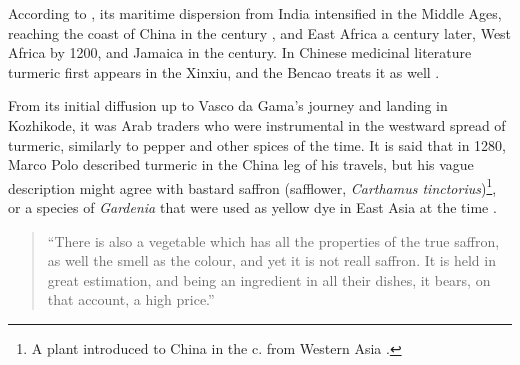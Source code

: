 According to \textcite[2]{nair_turmeric_2019}, its maritime dispersion from India intensified in the Middle Ages, reaching the coast of China in the  century \AD, and East Africa a century later, West Africa by 1200, and Jamaica in the  century. In Chinese medicinal literature turmeric first appears in the \gls{Xinxiu}, and the \gls{Bencao} treats it as well \autocite{feng_molecular_2011}. 

From its initial diffusion up to Vasco da Gama's journey and landing in Kozhikode, it was Arab traders who were instrumental in the westward spread of turmeric, similarly to pepper and other spices of the time. It is said that in 1280, Marco Polo described turmeric in the China leg of his travels, but his vague description might agree with bastard saffron (safflower, \textit{Carthamus tinctorius})\footnote{A plant introduced to China in the  c. \BC from Western Asia \autocite[226]{polo_travels_1993}.}, or a species of \textit{Gardenia} that were used as yellow dye in East Asia at the time \autocite[226]{polo_travels_1993}.

\begin{quote}
	``There is also a vegetable which has all the properties of the true saffron, as well the smell as the colour, and yet it is not reall saffron. It is held in great estimation, and being an ingredient in all their dishes, it bears, on that account, a high price.'' \autocite[251-252]{komroff_travels_1926}
\end{quote}


